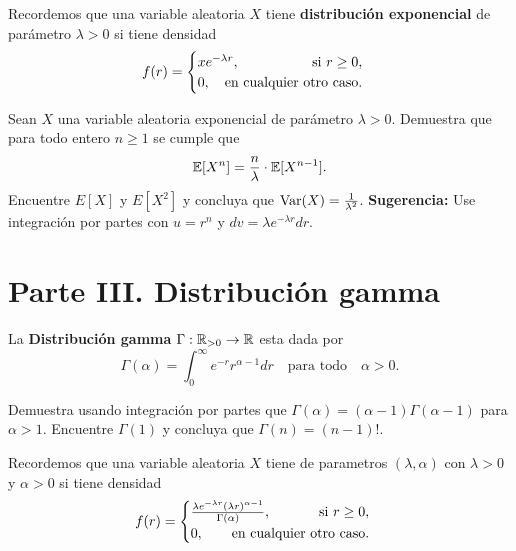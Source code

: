 \documentclass[12pt,a4paper]{article}
\begin{document}
    Recordemos que una variable aleatoria $X$ tiene \textbf{distribución exponencial} de parámetro $\lambda\gt0$ si tiene densidad
    \begin{equation*}
        f(r)=
        \begin{cases}
            xe^{-\lambda r},\hfill\quad\text{si }r\geq0,\\
            0,\hfill\quad\text{en cualquier otro caso}.
        \end{cases}
    \end{equation*}

    \begin{mdframed}[style=mdpinkbox,frametitle={Ejercicio 3}]
        Sean $X$ una variable aleatoria exponencial de parámetro $\lambda\gt0$. Demuestra que para todo entero $n\geq1$ se cumple que
        \begin{equation*}
            \mathbb{E}[X^{n}]=\frac{n}{\lambda}\cdot\mathbb{E}[X^{n-1}].
        \end{equation*}
        Encuentre $E[X]$ y $E[X^{2}]$ y concluya que $\operatorname{Var}(X)=\frac{1}{\lambda^{2}}$. \textbf{Sugerencia:} Use integración por partes
        con $u=r^{n}$ y $dv=\lambda e^{-\lambda r}dr$.
    \end{mdframed}

    \section*{Parte III. Distribución gamma}

    La \textbf{Distribución gamma} $\Gamma:\mathbb{R}_{>0}\to\mathbb{R}$ esta dada por
    \begin{equation*}
        \Gamma(\alpha)=\int_{0}^{\infty}e^{-r}r^{\alpha-1}dr\quad\text{para todo}\quad\alpha\gt0.
    \end{equation*}

    \begin{mdframed}[style=mdpinkbox,frametitle={Ejercicio 4}]
        Demuestra usando integración por partes que $\Gamma(\alpha)=(\alpha-1)\Gamma(\alpha-1)$ para $\alpha\gt1$. Encuentre
        $\Gamma(1)$ y concluya que $\Gamma(n)=(n-1)!$.
    \end{mdframed}

    Recordemos que una variable aleatoria $X$ tiene  de parametros $(\lambda,\alpha)$ con $\lambda\gt0$
    y $\alpha\gt0$ si tiene densidad
    \begin{equation*}
        f(r)=
        \begin{cases}
            \frac{\lambda e^{-\lambda r}(\lambda r)^{\alpha-1}}{\Gamma(\alpha)},\hfill\text{si } r\geq0,\\
            0,\qquad\text{en cualquier otro caso}.
        \end{cases}
    \end{equation*}
\end{document}

